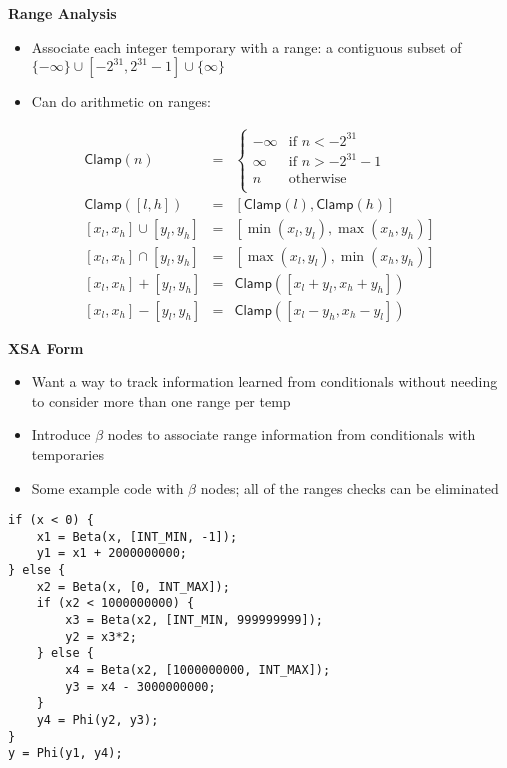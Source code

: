 \documentclass{slides}
\newcommand{\Clamp}{\mathsf{Clamp}}
\begin{document}
\begin{slide}
\begin{center}
{\Huge \bf{Range Analysis}}
\end{center}
\begin{itemize}
\item Associate each integer temporary with a range: a contiguous subset of $\{-\infty\} \cup [-2^{31}, 2^{31}-1] \cup \{\infty\}$
\item Can do arithmetic on ranges:
\end{itemize}
\begin{eqnarray*}
\Clamp(n) &=& \begin{cases}
-\infty &\text{if } n < -2^{31} \\
\infty &\text{if } n > -2^{31}-1 \\
n&\text{otherwise } \\
\end{cases}\\
\Clamp([l, h]) &=& [\Clamp(l), \Clamp(h)] \\
{[x_l, x_h] \cup [y_l, y_h]} &=& [\min(x_l, y_l), \max(x_h, y_h)] \\
{[x_l, x_h] \cap [y_l, y_h]} &=& [\max(x_l, y_l), \min(x_h, y_h)] \\
{[x_l, x_h] + [y_l, y_h]} &=& \Clamp ([x_l + y_l, x_h + y_h]) \\
{[x_l, x_h] - [y_l, y_h]} &=& \Clamp ([x_l - y_h, x_h - y_l])
\end{eqnarray*}
\end{slide}


\begin{slide}
\begin{center}
{\Huge \bf{XSA Form}}
\end{center}
\begin{itemize}
\item Want a way to track information learned from conditionals without needing to consider more than one range per temp
\item Introduce $\beta$ nodes to associate range information from conditionals with temporaries
\item Some example code with $\beta$ nodes; all of the ranges checks can be eliminated
\end{itemize}
{\tiny
\begin{verbatim}
if (x < 0) {
    x1 = Beta(x, [INT_MIN, -1]);
    y1 = x1 + 2000000000;
} else {
    x2 = Beta(x, [0, INT_MAX]);
    if (x2 < 1000000000) {
        x3 = Beta(x2, [INT_MIN, 999999999]);
        y2 = x3*2;
    } else {
        x4 = Beta(x2, [1000000000, INT_MAX]);
        y3 = x4 - 3000000000;
    }
    y4 = Phi(y2, y3);
}
y = Phi(y1, y4);
\end{verbatim}
}
\end{slide}
\end{document}
